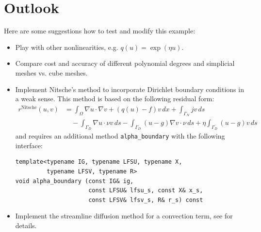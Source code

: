\documentclass[a4paper,12pt]{article}
\begin{document}
\section{Outlook}

Here are some suggestions how to test and modify this example:
\begin{itemize}
\item Play with other nonlinearities, e.g. $q(u)=\exp(\eta u)$.
\item Compare cost and accuracy of different polynomial degrees and
simplicial meshes vs. cube meshes.
\item Implement Nitsche's method to incorporate Dirichlet boundary conditions 
in a weak sense. This method is based on the following residual form:
\begin{equation*}
\begin{split}
r^{\text{Nitsche}}(u,v) &= \int_\Omega \nabla u \cdot \nabla v + (q(u)-f)v\,dx + \int_{\Gamma_N} jv\,ds \\
&\quad - \int_{\Gamma_D} \nabla u \cdot\nu v\,ds - \int_{\Gamma_D} (u-g)\nabla v \cdot\nu\,ds 
+ \eta \int_{\Gamma_D} (u-g)v\,ds
\end{split}
\end{equation*}
and requires an additional method \lstinline{alpha_boundary} with the following interface:
\begin{lstlisting}[basicstyle=\ttfamily\small,
frame=single,
backgroundcolor=\color{listingbg}]
template<typename IG, typename LFSU, typename X, 
         typename LFSV, typename R>
void alpha_boundary (const IG& ig,
                     const LFSU& lfsu_s, const X& x_s, 
                     const LFSV& lfsv_s, R& r_s) const
\end{lstlisting}

\item Implement the streamline diffusion method for a convection term, see \cite{Elman2005} for details.
\end{itemize}



\end{document}
